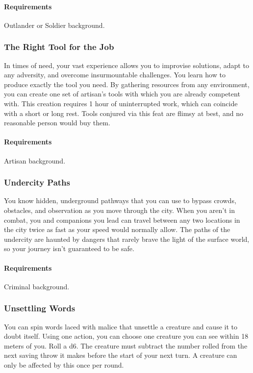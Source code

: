     \paragraph{Requirements} Outlander or Soldier background.
\subsubsection{The Right Tool for the Job} \label{feat::therighttoolforthejob}
    In times of need, your vast experience allows you to improvise solutions, adapt to any adversity, and overcome insurmountable challenges.
    You learn how to produce exactly the tool you need.
    By gathering resources from any environment, you can create one set of artisan's tools with which you are already competent with.
    This creation requires 1 hour of uninterrupted work, which can coincide with a short or long rest.
    Tools conjured via this feat are flimsy at best, and no reasonable person would buy them.
    \paragraph{Requirements} Artisan background.
\subsubsection{Undercity Paths} \label{feat::undercitypaths}
    You know hidden, underground pathways that you can use to bypass crowds, obstacles, and observation as you move through the city.
    When you aren't in combat, you and companions you lead can travel between any two locations in the city twice as fast as your speed would normally allow.
    The paths of the undercity are haunted by dangers that rarely brave the light of the surface world, so your journey isn't guaranteed to be safe.
    \paragraph{Requirements} Criminal background.
\subsubsection{Unsettling Words} \label{feat::unsettlingwords}
    You can spin words laced with malice that unsettle a creature and cause it to doubt itself.
    Using one action, you can choose one creature you can see within 18 meters of you.
    Roll a d6.
    The creature must subtract the number rolled from the next saving throw it makes before the start of your next turn.
    A creature can only be affected by this once per round.

